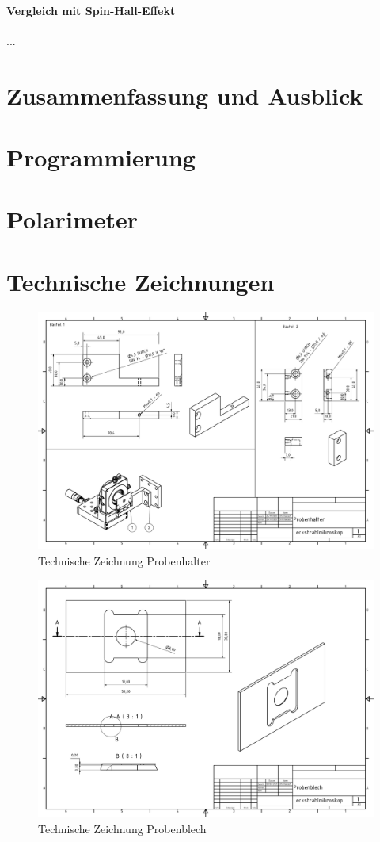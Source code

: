 \documentclass[titlepage]{article}
\begin{document}
	\paragraph{Vergleich mit Spin-Hall-Effekt}
	...
\section{Zusammenfassung und Ausblick}

\newpage
\appendix

\section{Programmierung}
\section{Polarimeter}
\newpage
\section{Technische Zeichnungen}
\begin{figure}
	\includegraphics[width=\textwidth]{figures/Technische_Zeichnung_Probenhalter.pdf}
	\caption{Technische Zeichnung Probenhalter}
	\label{fig:tz_probenhalter}
\end{figure}
\begin{figure}
	\includegraphics[width=\textwidth]{figures/Probenblech.pdf}
	\caption{Technische Zeichnung Probenblech}
	\label{fig:tz_probenblech}
\end{figure}
\end{document}
